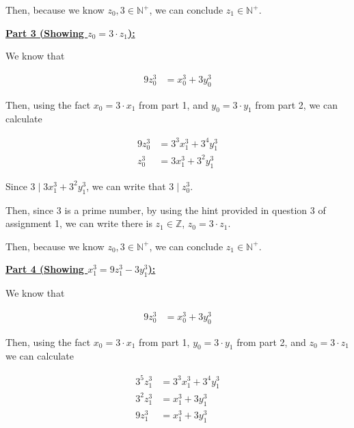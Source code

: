 \documentclass[12pt]{article}
\begin{document}
\begin{mdframed}
\begin{enumerate}[1.]
\begin{mdframed}
        \bigskip

        Then, because we know $z_0, 3 \in \mathbb{N}^+$, we can conclude
        $z_1 \in \mathbb{N}^+$.

        \bigskip

        \underline{\textbf{Part 3 (Showing $z_0 = 3 \cdot z_1$):}}

        \bigskip

        We know that

        \begin{align}
            9z_0^3 &= x_0^3 + 3y_0^3
        \end{align}

        \bigskip

        Then, using the fact $x_0 = 3 \cdot x_1$ from part 1, and
        $y_0 = 3 \cdot y_1$ from part 2, we can calculate

        \begin{align}
            9z_0^3 &= 3^3x_1^3 + 3^4y_1^3\\
            z_0^3 &= 3x_1^3 + 3^2y_1^3
        \end{align}

        \bigskip

        Since $3 \mid 3x_1^3 + 3^2y_1^3$, we can write that $3 \mid z_0^3$.

        \bigskip

        Then, since 3 is a prime number, by using the hint provided in question 3
        of assignment 1, we can write there is $z_1 \in \mathbb{Z}$, $z_0 = 3 \cdot z_1$.

        \bigskip

        Then, because we know $z_0, 3 \in \mathbb{N}^+$, we can conclude
        $z_1 \in \mathbb{N}^+$.

        \bigskip

        \underline{\textbf{Part 4 (Showing $x_1^3 = 9z_1^3 - 3y_1^3$):}}

        \bigskip

        We know that

        \begin{align}
            9z_0^3 &= x_0^3 + 3y_0^3
        \end{align}

        \bigskip

        Then, using the fact $x_0 = 3 \cdot x_1$ from part 1,
        $y_0 = 3 \cdot y_1$ from part 2, and $z_0 = 3 \cdot z_1$ we can calculate

        \begin{align}
            3^5z_1^3 &= 3^3x_1^3 + 3^4y_1^3\\
            3^2z_1^3 &= x_1^3 + 3y_1^3\\
            9z_1^3 &= x_1^3 + 3y_1^3
        \end{align}


\end{mdframed}
\end{enumerate}
\end{mdframed}
\end{document}
